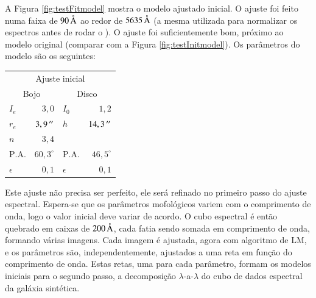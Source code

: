 A Figura \ref{fig:testFitmodel} mostra o modelo ajustado inicial. O ajuste
foi feito numa faixa de $90\,\text{\normalfont\AA}$ ao redor de $5635\,\text{\normalfont\AA}$ (a
mesma utilizada para normalizar os espectros antes de rodar o \starlight).
O ajuste foi suficientemente bom, próximo ao modelo original (comparar com a
Figura \ref{fig:testInitmodel}). Os parâmetros do modelo são os seguintes: 

\begin{tabular}{ l  r | l  r }
  \hline
  \multicolumn{4}{c}{Ajuste inicial} \\
  \multicolumn{2}{c}{Bojo} & \multicolumn{2}{c}{Disco} \\
  \hline
  $I_e$ & $3,0$ & $I_0$ & $1,2$ \\
  $r_e$ & $3,9\,^{\prime\prime}$ & $h$ & $14,3\,^{\prime\prime}$ \\
  $n$ & $3,4$ & & \\
  $\mathrm{P.A.}$ & $60,3^\circ$ & $\mathrm{P.A.}$ & $46,5^\circ$ \\
  $\epsilon$ & $0,1$ & $\epsilon$ & $0,1$ \\
  \hline
\end{tabular}

Este ajuste não precisa ser perfeito, ele será refinado no primeiro passo do
ajuste espectral. Espera-se que os  parâmetros mofológicos variem com o
comprimento de onda, logo o valor inicial deve variar de acordo. O cubo
espectral é então quebrado em caixas de $200\,\text{\normalfont\AA}$, cada fatia sendo
somada em comprimento de onda, formando várias imagens. Cada imagem é ajustada,
agora com algoritmo de LM, e os parâmetros são, independentemente, ajustados a
uma reta em função do comprimento de onda. Estas retas, uma para cada parâmetro,
formam os modelos iniciais para o segundo passo, a decomposição
$\lambda$-a-$\lambda$ do cubo de dados espectral da galáxia sintética.

